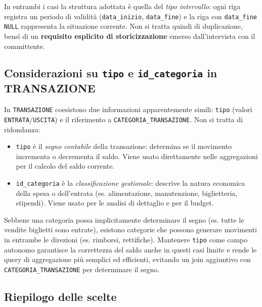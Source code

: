 \documentclass[12pt,a4paper]{report}
\begin{document}
In entrambi i casi la struttura adottata è quella del \emph{tipo intervallo}:
ogni riga registra un periodo di validità (\texttt{data\_inizio}, \texttt{data\_fine})
e la riga con \texttt{data\_fine} \texttt{NULL} rappresenta la situazione corrente.
Non si tratta quindi di duplicazione, bensì di un \textbf{requisito esplicito di
storicizzazione} emerso dall'intervista con il committente.

\subsection*{Considerazioni su \texttt{tipo} e \texttt{id\_categoria} in TRANSAZIONE}

In \texttt{TRANSAZIONE} coesistono due informazioni apparentemente simili:
\texttt{tipo} (valori \texttt{ENTRATA}/\texttt{USCITA}) e il riferimento a
\texttt{CATEGORIA\_TRANSAZIONE}. Non si tratta di ridondanza:

\begin{itemize}[itemsep=2pt]
  \item \texttt{tipo} è il \emph{segno contabile} della transazione: determina se
        il movimento incrementa o decrementa il saldo. Viene usato direttamente
        nelle aggregazioni per il calcolo del saldo corrente.

  \item \texttt{id\_categoria} è la \emph{classificazione gestionale}: descrive
        la natura economica della spesa o dell'entrata (es. alimentazione, manutenzione,
        biglietteria, stipendi). Viene usato per le analisi di dettaglio e per
        il budget.
\end{itemize}

Sebbene una categoria possa implicitamente determinare il segno (es. tutte le
vendite biglietti sono entrate), esistono categorie che possono generare movimenti
in entrambe le direzioni (es. rimborsi, rettifiche). Mantenere \texttt{tipo} come
campo autonomo garantisce la correttezza del saldo anche in questi casi limite e
rende le query di aggregazione più semplici ed efficienti, evitando un join aggiuntivo
con \texttt{CATEGORIA\_TRANSAZIONE} per determinare il segno.

\subsection*{Riepilogo delle scelte}
\end{document}
